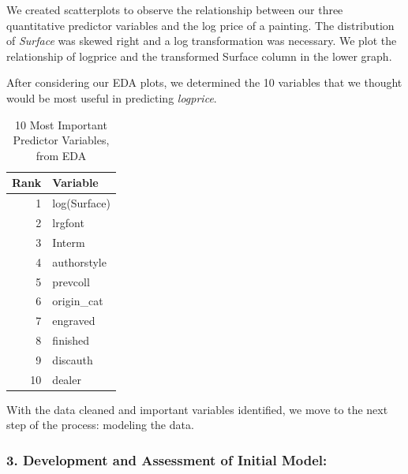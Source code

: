 \documentclass[]{article}
\begin{document}
We created scatterplots to observe the relationship between our three
quantitative predictor variables and the log price of a painting. The
distribution of \emph{Surface} was skewed right and a log transformation
was necessary. We plot the relationship of logprice and the transformed
Surface column in the lower graph.

After considering our EDA plots, we determined the 10 variables that we
thought would be most useful in predicting \emph{logprice}.

\begin{table}

\caption{\label{tab:kable important variables}10 Most Important Predictor Variables, from EDA}
\centering
\begin{tabular}[t]{r|l}
\hline
Rank & Variable\\
\hline
1 & log(Surface)\\
\hline
2 & lrgfont\\
\hline
3 & Interm\\
\hline
4 & authorstyle\\
\hline
5 & prevcoll\\
\hline
6 & origin\_cat\\
\hline
7 & engraved\\
\hline
8 & finished\\
\hline
9 & discauth\\
\hline
10 & dealer\\
\hline
\end{tabular}
\end{table}

With the data cleaned and important variables identified, we move to the
next step of the process: modeling the data.

\hypertarget{development-and-assessment-of-initial-model}{%
\subsubsection{3. Development and Assessment of Initial
Model:}\label{development-and-assessment-of-initial-model}}
\end{document}
